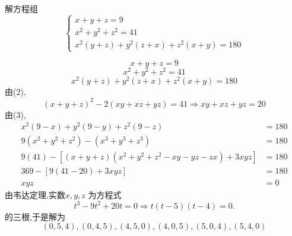 \begin{questions}
    \question 解方程组
    \[
    \begin{cases}
    x+y+z = 9  \\
    x^2+y^2+z^2 = 41  \\
    x^2(y+z) + y^2(z+x) + z^2(x+y) = 180
    \end{cases}
    \]
    \begin{solution}
        \[
        x+y+z = 9 \tag{1}
        \]
        \[
        x^2+y^2+z^2 = 41 \tag{2}
        \]
        \[
        x^2(y+z) + y^2(z+x) + z^2(x+y) = 180 \tag{3}
        \]
        由(2),
        \[
        (x+y+z)^2 - 2(xy+xz+yz) = 41 \Rightarrow xy+xz+yz = 20
        \]
        由(3),
        \begin{align*}
        x^2(9-x) + y^2(9-y) + z^2(9-z) &= 180 \\
        9(x^2+y^2+z^2) - (x^3+y^3+z^3) &= 180 \\
        9(41) - [(x+y+z)(x^2+y^2+z^2 - xy - yz - zx) + 3xyz] &= 180 \\
        369 - [9(41-20) + 3xyz] &= 180 \\
        xyz &= 0
        \end{align*}
        由韦达定理,实数$x, y, z$ 为方程式
        \[
        t^3 - 9t^2 + 20t = 0 \Rightarrow t(t-5)(t-4) = 0.
        \]
        的三根,于是解为
        \[
        (0,5,4), (0,4,5), (4,5,0), (4,0,5), (5,0,4), (5,4,0)
        \]
    \end{solution}


\end{questions}
